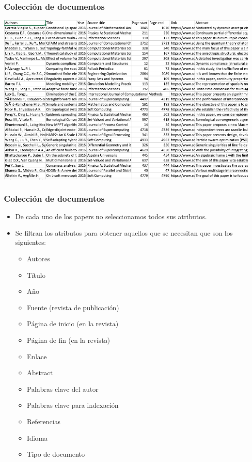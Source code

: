 \documentclass{beamer} %
\begin{document}
\begin{frame}
\frametitle{Colección de documentos}
	\begin{center}
		\includegraphics[scale=0.35]{Img/Img2.png} 
	\end{center}
\end{frame}

\begin{frame}
\frametitle{Colección de documentos}
\begin{itemize}
\item De cada uno de los papers no seleccionamos todos sus atributos.
\item Se filtran los atributos para obtener aquellos que se necesitan que son los siguientes:
 \begin{itemize}
 	\item Autores
	\item Título
	\item Año
	\item Fuente (revista de publicación)
	\item Página de inicio (en la revista)
	\item Página de fin (en la revista)
	\item Enlace
	\item Abstract
	\item Palabras clave del autor
	\item Palabras clave para indexación
	\item Referencias
	\item Idioma
	\item Tipo de documento
 \end{itemize}
\end{itemize}
\end{frame}
\end{document}
